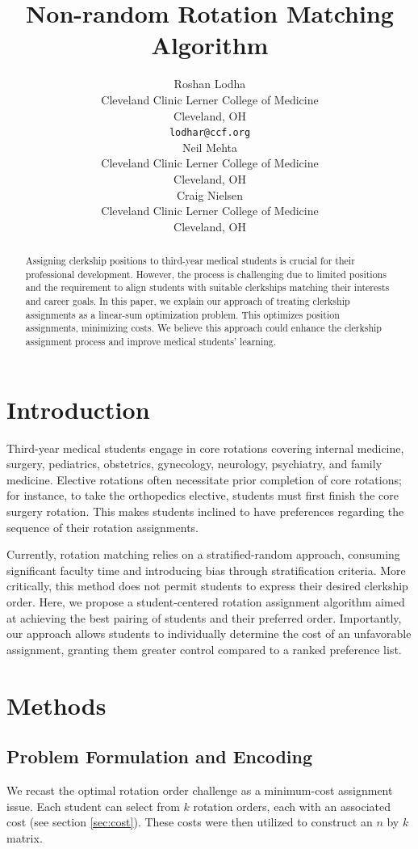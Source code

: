 \documentclass{article}
\title{Non-random Rotation Matching Algorithm}
\author{
  Roshan Lodha \\
  Cleveland Clinic Lerner College of Medicine \\
  Cleveland, OH\\
  \texttt{lodhar@ccf.org} \\
  \AND
  Neil Mehta \\
  Cleveland Clinic Lerner College of Medicine \\
  Cleveland, OH\\
  \And
  Craig Nielsen \\
  Cleveland Clinic Lerner College of Medicine \\
  Cleveland, OH\\
}
\begin{document}
\maketitle


\begin{abstract}
Assigning clerkship positions to third-year medical students is crucial for their professional development. However, the process is challenging due to limited positions and the requirement to align students with suitable clerkships matching their interests and career goals. In this paper, we explain our approach of treating clerkship assignments as a linear-sum optimization problem. This optimizes position assignments, minimizing costs. We believe this approach could enhance the clerkship assignment process and improve medical students’ learning.
\end{abstract}


\section{Introduction}
Third-year medical students engage in core rotations covering internal medicine, surgery, pediatrics, obstetrics, gynecology, neurology, psychiatry, and family medicine. Elective rotations often necessitate prior completion of core rotations; for instance, to take the orthopedics elective, students must first finish the core surgery rotation. This makes students inclined to have preferences regarding the sequence of their rotation assignments.

Currently, rotation matching relies on a stratified-random approach, consuming significant faculty time and introducing bias through stratification criteria. More critically, this method does not permit students to express their desired clerkship order. Here, we propose a student-centered rotation assignment algorithm aimed at achieving the best pairing of students and their preferred order. Importantly, our approach allows students to individually determine the cost of an unfavorable assignment, granting them greater control compared to a ranked preference list.


\section{Methods}
\label{sec:methods}

\subsection{Problem Formulation and Encoding}
We recast the optimal rotation order challenge as a minimum-cost assignment issue. Each student can select from $k$ rotation orders, each with an associated cost (see section \ref{sec:cost}). These costs were then utilized to construct an $n$ by $k$ matrix.
\end{document}
